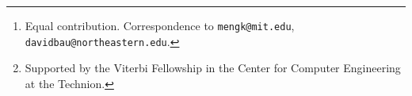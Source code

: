 \author{%
Kevin Meng\thanks{Equal contribution. Correspondence to \texttt{mengk@mit.edu}, \texttt{davidbau@northeastern.edu}.} \\
MIT CSAIL \\
\And
David Bau$^*$ \\
Northeastern University \\
\And
Alex Andonian \\
MIT CSAIL \\
\And
Yonatan Belinkov\thanks{Supported by the Viterbi Fellowship in the Center for Computer Engineering at the Technion.} \\
Technion -- IIT \\
}